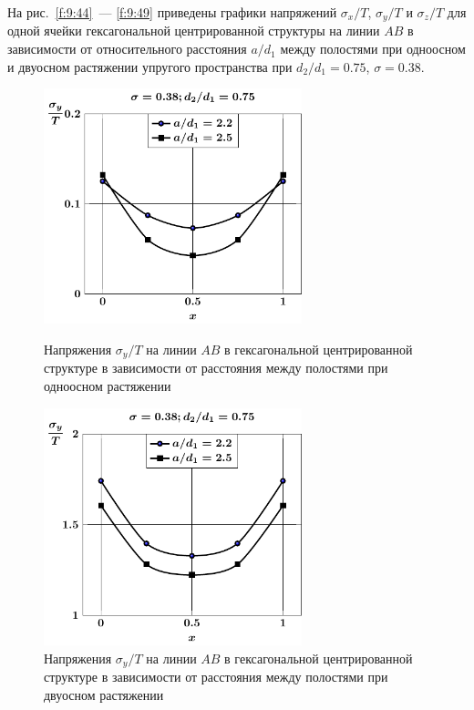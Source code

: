 На рис.~\ref{f:9:44}~--- \ref{f:9:49} приведены графики напряжений $\sigma_x/T$, $\sigma_y/T$ и $\sigma_z/T$ для одной ячейки гексагональной центрированной структуры на линии $AB$ в зависимости от относительного расстояния $a/d_1$ между полостями при одноосном и двуосном растяжении упругого пространства при $d_2/d_1=0.75$, $\sigma=0.38$.

\begin{figure}[h!]
\centering\footnotesize
\parbox[b]{7.5cm}{\centering\includegraphics[width=7.5cm]{cav13-a-d75-t1-sig_y.pdf}
\caption{Напряжения $\sigma_y/T$ на линии $AB$ в гексагональной центрированной структуре в зависимости от расстояния между полостями при одноосном растяжении 
\label{f:9:46}}}\hfil\hfil
\parbox[b]{7.5cm}{\centering\includegraphics[width=7.5cm]{cav13-a-d75-t2-sig_y.pdf}
\caption{Напряжения $\sigma_y/T$ на линии $AB$ в гексагональной центрированной структуре в зависимости от расстояния между полостями при двуосном растяжении
\label{f:9:47}}}
\end{figure}

